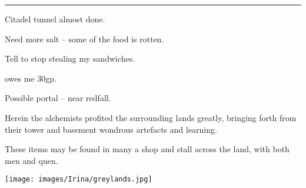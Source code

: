 
\hrule

\vspace{2em}

{
\titleFont
Citadel tunnel almost done.

Need more salt -- some of the food is rotten.

Tell  to stop stealing my sandwiches.

 owes me 30gp.

Possible portal -- near \gls{redfall}.
}

\cleardoublepage



\begin{center}
\begin{minipage}{.7\textwidth}
{
\titleFont\Large
Herein the alchemists profited the surrounding lands greatly, bringing forth from their tower and basement wondrous artefacts and learning.

These items may be found in many a shop and stall across the land, with both men and quen.
}

\end{minipage}
\end{center}

\cleardoublepage



\cleardoublepage

\texttt{[image: images/Irina/greylands.jpg]}

\cleardoublepage



\cleardoublepage


\cleardoublepage


\cleardoublepage



